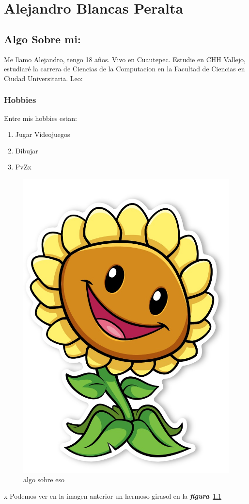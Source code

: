 \chapter{Alejandro Blancas Peralta}

\section{Algo Sobre mi:}
Me llamo Alejandro, tengo 18 años. Vivo en Cuautepec. Estudie en CHH Vallejo, estudiaré la carrera de Ciencias de la Computacion en la Facultad de Ciencias en Ciudad Universitaria.
 Leo:~\cite{comunidad,torres,retorno}

\subsection{Hobbies}
Entre mis hobbies estan:

\begin{enumerate}
  \item Jugar Videojuegos
  \item Dibujar
  \item PvZx
\end{enumerate}

\begin{figure}[h]
  \centering
  \includegraphics[scale=0.2]{IMG/Girasol_.jpg}
  \caption{\small algo sobre eso} \label{fig:Girasol_}
\end{figure}
x
Podemos ver en la imagen anterior un hermoso girasol en la
\emph{\textbf{figura}}~\ref{fig:Girasol_}


